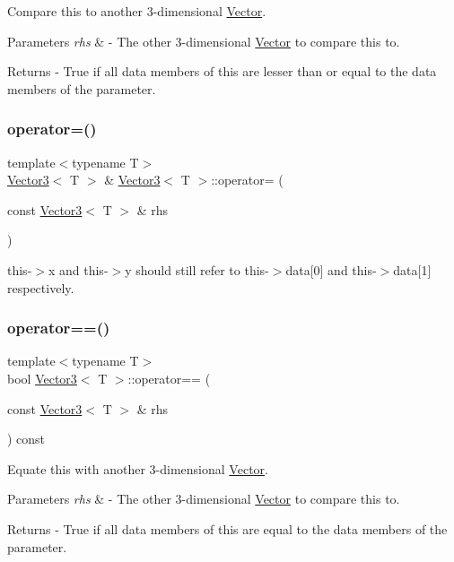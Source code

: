 Compare this to another 3-\/dimensional \mbox{\hyperlink{class_vector}{Vector}}. 
\begin{DoxyParams}{Parameters}
{\em rhs} & -\/ The other 3-\/dimensional \mbox{\hyperlink{class_vector}{Vector}} to compare this to. \\
\hline
\end{DoxyParams}
\begin{DoxyReturn}{Returns}
-\/ True if all data members of this are lesser than or equal to the data members of the parameter. 
\end{DoxyReturn}
\mbox{\label{class_vector3_ab8de8c58175e9e0beb4b71ed1e0ada1f}} 
\subsubsection{\texorpdfstring{operator=()}{operator=()}}
{\footnotesize\ttfamily template$<$typename T$>$ \\
\mbox{\hyperlink{class_vector3}{Vector3}}$<$ T $>$ \& \mbox{\hyperlink{class_vector3}{Vector3}}$<$ T $>$\+::operator= (\begin{DoxyParamCaption}\item[{const \mbox{\hyperlink{class_vector3}{Vector3}}$<$ T $>$ \&}]{rhs }\end{DoxyParamCaption})}

this-\/$>$x and this-\/$>$y should still refer to this-\/$>$data\mbox{[}0\mbox{]} and this-\/$>$data\mbox{[}1\mbox{]} respectively. \mbox{\label{class_vector3_a4206accf1c00e63b0181a56a32ba3c01}} 
\subsubsection{\texorpdfstring{operator==()}{operator==()}}
{\footnotesize\ttfamily template$<$typename T$>$ \\
bool \mbox{\hyperlink{class_vector3}{Vector3}}$<$ T $>$\+::operator== (\begin{DoxyParamCaption}\item[{const \mbox{\hyperlink{class_vector3}{Vector3}}$<$ T $>$ \&}]{rhs }\end{DoxyParamCaption}) const}

Equate this with another 3-\/dimensional \mbox{\hyperlink{class_vector}{Vector}}. 
\begin{DoxyParams}{Parameters}
{\em rhs} & -\/ The other 3-\/dimensional \mbox{\hyperlink{class_vector}{Vector}} to compare this to. \\
\hline
\end{DoxyParams}
\begin{DoxyReturn}{Returns}
-\/ True if all data members of this are equal to the data members of the parameter. 
\end{DoxyReturn}
\mbox{\label{class_vector3_a87afbd96a97adff42c58bde870af47c4}} 
